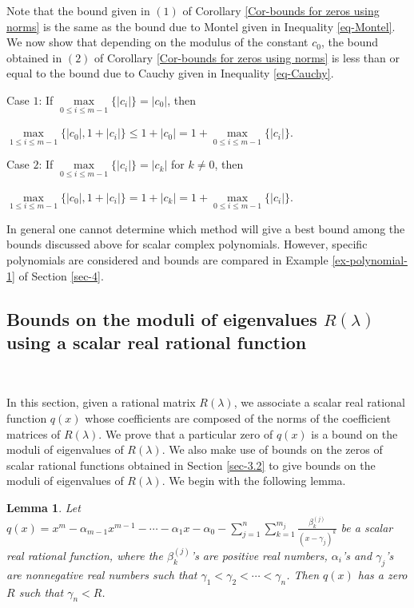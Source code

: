\documentclass[12pt, reqno]{amsart}
\newtheorem{lemma}[theorem]{Lemma}
\theoremstyle{definition}
\theoremstyle{remark}
\numberwithin{equation}{section}
\begin{document}
\noindent
Note that the bound given in $(1)$ of Corollary \ref{Cor-bounds for zeros using norms} 
is the same as the bound due to Montel given in Inequality \eqref{eq-Montel}. We now 
show that depending on the modulus of the constant $c_0$, the bound obtained in $(2)$ 
of Corollary \ref{Cor-bounds for zeros using norms} is less than or equal to the bound 
due to Cauchy given in Inequality \eqref{eq-Cauchy}.

\noindent
Case $1$: If $\max\limits_{0 \leq i \leq m-1} \{|c_i| \} = |c_0|$, 
then 
\begin{center}
$\max\limits_{1 \leq i \leq m-1} \{|c_0|, 1+|c_i| \} \leq 1+|c_0| = 1+
\max\limits_{0 \leq i \leq m-1} \{|c_i| \}$.
\end{center}
Case $2$: If $\max\limits_{0 \leq i \leq m-1} \{|c_i| \} = |c_k|$ for $k \neq 0$, 
then 
\begin{center}
$\max\limits_{1 \leq i \leq m-1} \{|c_0|, 1+|c_i| \} = 1+|c_k| = 1+
\max\limits_{0 \leq i \leq m-1} \{|c_i| \}$.
\end{center}
In general one cannot determine which method will give a best bound among the bounds 
discussed above for scalar complex polynomials. However, specific polynomials are 
considered and bounds are compared in Example \ref{ex-polynomial-1} of Section \ref{sec-4}.


\subsection{Bounds on the moduli of eigenvalues $R(\lambda)$ using a scalar real rational function} 

\

In this section, given a rational matrix $R(\lambda)$, we associate a scalar 
real rational function $q(x)$ whose coefficients are composed of the norms of the 
coefficient matrices of $R(\lambda)$. We prove that a particular zero of $q(x)$ 
is a bound on the moduli of eigenvalues of $R(\lambda)$. We also make use of 
bounds on the zeros of scalar rational functions obtained in Section \ref{sec-3.2} 
to give bounds on the moduli of eigenvalues of $R(\lambda)$. We begin with the 
following lemma.
 
\begin{lemma}\label{Lem-zeros of rational function}
Let $q(x) = x^m-\alpha_{m-1}x^{m-1}-\cdots - \alpha_1 x - \alpha_0 - \displaystyle 
\sum_{j=1}^{n} \sum_{k=1}^{m_j} \frac{\beta_k^{(j)}}{(x-\gamma_j)^k}$ be a scalar real 
rational function, where the $\beta_k^{(j)}$'s are positive real numbers, $\alpha_i$'s 
and $\gamma_j$'s are nonnegative real numbers such that $\gamma_1 < \gamma_2 < \cdots 
< \gamma_n$. Then $q(x)$ has a zero $R$ such that $ \gamma_n < R$.
\end{lemma}
\end{document}
